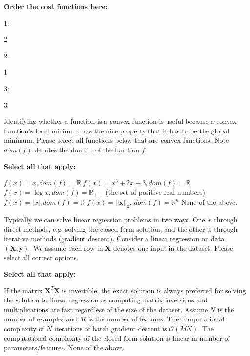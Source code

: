 \documentclass[11pt,addpoints,answers]{exam}
\numberwithin{equation}{section} %
\numberwithin{figure}{section} %
\numberwithin{table}{section} %
\newcommand{\xv}{\mathbf{x}}
\newcommand{\yv}{\mathbf{y}}
\newcommand{\Xv}{\mathbf{X}}
\begin{document}
\begin{questions}
\textbf{Order the cost functions here:}

    1: \quad
    \begin{tcolorbox}[fit,height=1cm, width=2cm, blank, borderline={1pt}{-2pt},nobeforeafter]
    2
    \end{tcolorbox} 
    
    
    2: \quad
    \begin{tcolorbox}[fit,height=1cm, width=2cm, blank, borderline={1pt}{-2pt},nobeforeafter]
    1
    \end{tcolorbox} 
    
    
    3: \quad
    \begin{tcolorbox}[fit,height=1cm, width=2cm, blank, borderline={1pt}{-2pt},nobeforeafter]
    3
    \end{tcolorbox} 
    
    
    \newpage
    

    
    \question[3] Identifying whether a function is a convex function is useful because a convex function's local minimum has the nice property that it has to be the global minimum. Please select all functions below that are convex functions. Note $dom(f)$ denotes the domain of the function $f$. \\
        {%
    \checkboxchar{$\Box$} \checkedchar{$\blacksquare$}
    \textbf{Select all that apply:}
    \begin{checkboxes}
        \choice $f(x) = x, dom(f) = \mathbb{R}$
        \CorrectChoice $f(x) = x^3 + 2x + 3, dom(f) = \mathbb{R}$
        \choice $f(x) = \log x, dom(f) = \mathbb{R}_{++}$ (the set of positive real numbers)
        \CorrectChoice $f(x) = |x|, dom(f) = \mathbb{R}$
        \CorrectChoice $f(x) = ||\xv||_2,\, dom(f) = \mathbb{R}^n$
        \choice None of the above.
    \end{checkboxes}
    }


    \question[2] Typically we can solve linear regression problems in two ways. One is through direct methods, e.g. solving the closed form solution, and the other is through iterative methods (gradient descent). Consider a linear regression on data $(\Xv, \yv)$. We assume each row in $\Xv$ denotes one input in the dataset. Please select all correct options.
    
    \textbf{Select all that apply:}
        {%
    \checkboxchar{$\Box$} \checkedchar{$\blacksquare$}
    \begin{checkboxes}
        \choice If the matrix $\Xv^T\Xv$ is invertible, the exact solution is always preferred for solving the solution to linear regression as computing matrix inversions and multiplications are fast regardless of the size of the dataset.
        \CorrectChoice Assume $N$ is the number of examples and $M$ is the number of features. The computational complexity of $N$ iterations of batch gradient descent is $\mathcal{O}(MN)$.
        \CorrectChoice The computational complexity of the closed form solution is linear in number of parameters/features.
        \choice None of the above.
    \end{checkboxes}
    }
    

\end{questions}
\end{document}
